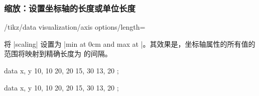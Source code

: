 \subsubsection{缩放：设置坐标轴的长度或单位长度}

\begin{key}{/tikz/data visualization/axis options/length=} %

    将 |scaling| 设置为 |min at 0cm and max at |。其效果是，坐标轴属性的所有值的范围将映射到精确长度为  的间隔。
\begin{codeexample}[preamble={\usetikzlibrary{datavisualization}}]
\tikz \datavisualization [scientific axes,
                          x axis={length=3cm},
                          y axis={length=2cm},
                          all axes={ticks=few},
                          visualize as line]
    data {
      x, y
      10, 10
      20, 20
      15, 30
      13, 20
    };
\end{codeexample}
\begin{codeexample}[preamble={\usetikzlibrary{datavisualization}}]
\tikz \datavisualization [scientific axes,
                          x axis={length=3cm},
                          y axis={length=4cm},
                          all axes={ticks=few},
                          visualize as line]
    data {
      x, y
      10, 10
      20, 20
      15, 30
      13, 20
    };
\end{codeexample}
\end{key}

